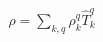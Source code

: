 \documentclass[preview]{standalone}
\begin{document}
\begin{align*}
\hat{\rho} = \sum_{k,q} \rho_k^q \hat{T}_k^q
\end{align*}
\end{document}
